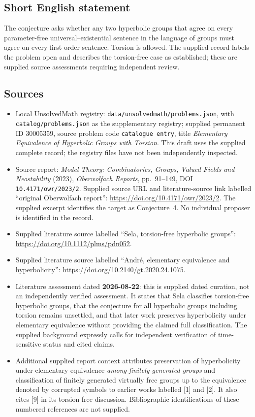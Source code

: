 \documentclass[11pt]{article}
\begin{document}
\subsection{Short English statement}
The conjecture asks whether any two hyperbolic groups that agree on every parameter-free universal--existential sentence in the language of groups must agree on every first-order sentence. Torsion is allowed. The supplied record labels the problem open and describes the torsion-free case as established; these are supplied source assessments requiring independent review.
\subsection{Sources}
\begin{itemize}
\item Local UnsolvedMath registry: \texttt{data/unsolvedmath/problems.json}, with \texttt{catalog/problems.json} as the supplementary registry; supplied permanent ID \(30005359\), source problem code \texttt{catalogue entry}, title \emph{Elementary Equivalence of Hyperbolic Groups with Torsion}. This draft uses the supplied complete record; the registry files have not been independently inspected.
\item Source report: \emph{Model Theory: Combinatorics, Groups, Valued Fields and Neostability} (2023), \emph{Oberwolfach Reports}, pp.~91--149, DOI \texttt{10.4171/owr/2023/2}. Supplied source URL and literature-source link labelled ``original Oberwolfach report'': \url{https://doi.org/10.4171/owr/2023/2}. The supplied excerpt identifies the target as Conjecture~4. No individual proposer is identified in the record.
\item Supplied literature source labelled ``Sela, torsion-free hyperbolic groups'': \url{https://doi.org/10.1112/plms/pdn052}.
\item Supplied literature source labelled ``Andr\'e, elementary equivalence and hyperbolicity'': \url{https://doi.org/10.2140/gt.2020.24.1075}.
\item Literature assessment dated \textbf{2026-08-22}: this is supplied dated curation, not an independently verified assessment. It states that Sela classifies torsion-free hyperbolic groups, that the conjecture for all hyperbolic groups including torsion remains unsettled, and that later work preserves hyperbolicity under elementary equivalence without providing the claimed full classification. The supplied background expressly calls for independent verification of time-sensitive status and cited claims.
\item Additional supplied report context attributes preservation of hyperbolicity under elementary equivalence \emph{among finitely generated groups} and classification of finitely generated virtually free groups up to the equivalence denoted by corrupted symbols to earlier works labelled [1] and [2]. It also cites [9] in its torsion-free discussion. Bibliographic identifications of these numbered references are not supplied.
\end{itemize}
\end{document}

